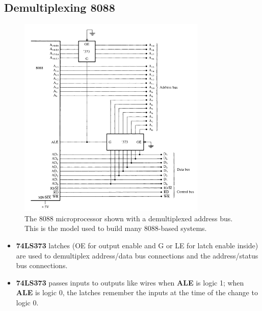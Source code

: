 \subsection{Demultiplexing 8088}
\begin{figure}[h!]
  \centering
  \includegraphics[width = 0.8\textwidth]{./figures/8088_demux.png}
  \caption{The 8088 microprocessor shown with a demultiplexed address bus. This is the
model used to build many 8088-based systems.}
  \label{}
\end{figure}
\begin{itemize}
  \item \textbf{74LS373} latches (OE for output enable and G or LE for latch enable inside) are used to demultiplex address/data bus connections and the address/status bus connections.
  \item \textbf{74LS373} passes inputs to outputs like wires when \textbf{ALE} is logic 1; when \textbf{ALE} is logic 0, the latches remember the inputs at the time of the change to logic 0.
\end{itemize}

